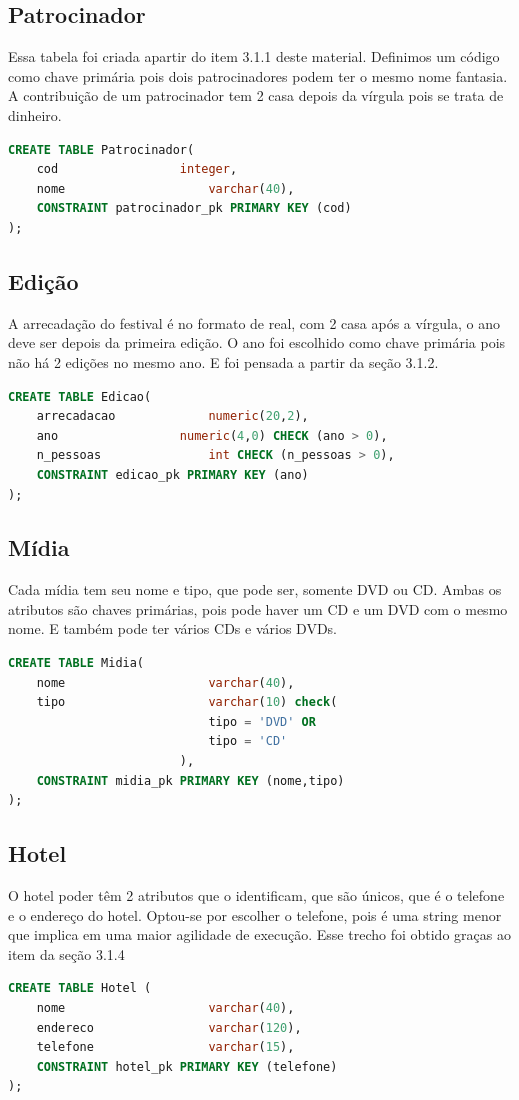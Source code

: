 \documentclass[12pt]{article}
\begin{document}
\subsection{Patrocinador}
Essa tabela foi criada apartir do item 3.1.1 deste material. Definimos um código como chave primária pois dois patrocinadores podem ter o mesmo nome fantasia. A contribuição de um patrocinador tem 2 casa depois da vírgula pois se trata de dinheiro.
\begin{lstlisting}[language=sql]
CREATE TABLE Patrocinador(
	cod					integer,
	nome					varchar(40),
	CONSTRAINT patrocinador_pk PRIMARY KEY (cod)
);

\end{lstlisting}

\subsection{Edição}
A arrecadação do festival é no formato de real, com 2 casa após a vírgula, o ano deve ser depois da primeira edição. O ano foi escolhido como chave primária pois não há 2 edições no mesmo ano. E foi pensada a partir da seção 3.1.2.
\begin{lstlisting}[language=sql]
CREATE TABLE Edicao(
	arrecadacao				numeric(20,2),
	ano					numeric(4,0) CHECK (ano > 0),
	n_pessoas				int CHECK (n_pessoas > 0),
	CONSTRAINT edicao_pk PRIMARY KEY (ano)
);
\end{lstlisting}

\subsection{Mídia}
Cada mídia tem seu nome e  tipo, que pode ser, somente DVD ou CD. Ambas os atributos são chaves primárias, pois pode haver um CD e um DVD com o mesmo nome. E também pode ter vários CDs e vários DVDs. \\

\begin{lstlisting}[language=sql]
CREATE TABLE Midia(
	nome					varchar(40),
	tipo					varchar(10) check(
							tipo = 'DVD' OR
							tipo = 'CD'
						),
	CONSTRAINT midia_pk PRIMARY KEY (nome,tipo)
);
\end{lstlisting}
\subsection{Hotel}
O hotel poder têm 2 atributos que o identificam, que são únicos, que é o telefone e o endereço do hotel. Optou-se por escolher o telefone, pois é uma string menor que implica em uma maior agilidade de execução. Esse trecho foi obtido graças ao item da seção 3.1.4
\begin{lstlisting}[language=sql]
CREATE TABLE Hotel (
	nome					varchar(40),
	endereco				varchar(120),
	telefone				varchar(15),
	CONSTRAINT hotel_pk PRIMARY KEY (telefone)
);
\end{lstlisting}
\end{document}
